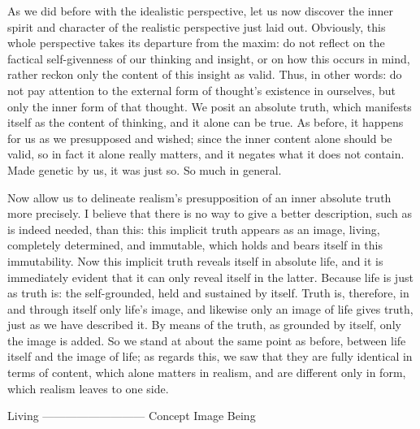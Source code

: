 As we did before with the idealistic perspective,
let us now discover the inner spirit and character
of the realistic perspective just laid out.
Obviously, this whole perspective takes
its departure from the maxim: do not
reflect on the factical self-givenness of our thinking and insight,
or on how this occurs in mind,
rather reckon only the content of this insight as valid.
Thus, in other words:
do not pay attention to the external form of thought’s existence in
ourselves,
but only the inner form of that thought.
We posit an absolute truth,
which manifests itself as the content of thinking,
and it alone can be true.
As before, it happens for us as we presupposed and wished;
since the inner content alone should be valid,
so in fact it alone really matters,
and it negates what it does not contain.
Made genetic by us, it was just so.
So much in general.

Now allow us to delineate realism’s presupposition
of an inner absolute truth more precisely.
I believe that there is no way to give a better description,
such as is indeed needed, than this:
this implicit truth appears as an image,
living, completely determined, and immutable,
which holds and bears itself in this immutability.
Now this implicit truth reveals itself in absolute life,
and it is immediately evident that it can only
reveal itself in the latter.
Because life is just as truth is:
the self-grounded, held and sustained by itself.
Truth is, therefore, in and through itself only life’s image,
and likewise only an image of life gives truth,
just as we have described it.
By means of the truth, as grounded by itself,
only the image is added.
So we stand at about the
same point as before,
between life itself and the image of life;
as regards this, we saw that they are
fully identical in terms of content,
which alone matters in realism,
and are different only in form,
which realism leaves to one side.

Living
—————————
Concept Image Being


